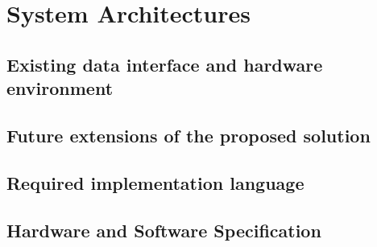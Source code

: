 \section{System Architectures}

\subsection{Existing data interface and hardware environment}
\subsection{Future extensions of the proposed solution}
\subsection{Required implementation language}
\subsection{Hardware and Software Specification}